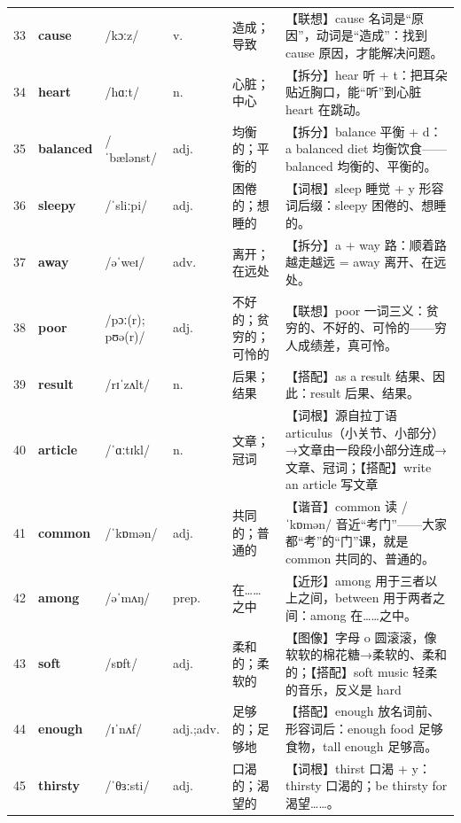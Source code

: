 \documentclass[UTF8,a4paper,11pt,oneside]{ctexbook}
\newcommand{\cellword}[1]{{\bfseries\textcolor{wordcol}{#1}}}
\newcommand{\cellipa}[1]{{\footnotesize\textcolor{ipacol}{#1}}}
\newcommand{\cellpos}[1]{\textcolor{poscol}{#1}}
\newcommand{\cellno}[1]{\textcolor{volcolor!75!black}{#1}}
\begin{document}
{\begin{longtable}{@{}C{0.045\textwidth}L{0.155\textwidth}L{0.175\textwidth}C{0.070\textwidth}L{0.180\textwidth}L{0.282\textwidth}@{}}
 \cellno{33} & \cellword{cause} & \cellipa{/kɔːz/} & \cellpos{v.} & 造成；导致 & \textcolor{tagAssoc}{【联想】}cause 名词是“原因”，动词是“造成”：找到 cause 原因，才能解决问题。 \\
\cellno{34} & \cellword{heart} & \cellipa{/hɑːt/} & \cellpos{n.} & 心脏；中心 & \textcolor{tagSplit}{【拆分】}hear 听 + t：把耳朵贴近胸口，能“听”到心脏 heart 在跳动。 \\
 \cellno{35} & \cellword{balanced} & \cellipa{/ˈbælənst/} & \cellpos{adj.} & 均衡的；平衡的 & \textcolor{tagSplit}{【拆分】}balance 平衡 + d：a balanced diet 均衡饮食——balanced 均衡的、平衡的。 \\
\cellno{36} & \cellword{sleepy} & \cellipa{/ˈsliːpi/} & \cellpos{adj.} & 困倦的；想睡的 & \textcolor{tagRoot}{【词根】}sleep 睡觉 + y 形容词后缀：sleepy 困倦的、想睡的。 \\
 \cellno{37} & \cellword{away} & \cellipa{/əˈweɪ/} & \cellpos{adv.} & 离开；在远处 & \textcolor{tagSplit}{【拆分】}a + way 路：顺着路越走越远 = away 离开、在远处。 \\
\cellno{38} & \cellword{poor} & \cellipa{/pɔː(r); pʊə(r)/} & \cellpos{adj.} & 不好的；贫穷的；可怜的 & \textcolor{tagAssoc}{【联想】}poor 一词三义：贫穷的、不好的、可怜的——穷人成绩差，真可怜。 \\
 \cellno{39} & \cellword{result} & \cellipa{/rɪˈzʌlt/} & \cellpos{n.} & 后果；结果 & \textcolor{tagColloc}{【搭配】}as a result 结果、因此：result 后果、结果。 \\
\cellno{40} & \cellword{article} & \cellipa{/ˈɑːtɪkl/} & \cellpos{n.} & 文章；冠词 & \textcolor{tagRoot}{【词根】}源自拉丁语 articulus（小关节、小部分）→\allowbreak{}文章由一段段小部分连成→\allowbreak{}文章、冠词；\textcolor{tagColloc}{【搭配】}write an article 写文章 \\
 \cellno{41} & \cellword{common} & \cellipa{/ˈkɒmən/} & \cellpos{adj.} & 共同的；普通的 & \textcolor{tagSound}{【谐音】}common 读 /ˈkɒmən/ 音近“考门”——大家都“考”的“门”课，就是 common 共同的、普通的。 \\
\cellno{42} & \cellword{among} & \cellipa{/əˈmʌŋ/} & \cellpos{prep.} & 在……之中 & \textcolor{tagNear}{【近形】}among 用于三者以上之间，between 用于两者之间：among 在……之中。 \\
 \cellno{43} & \cellword{soft} & \cellipa{/sɒft/} & \cellpos{adj.} & 柔和的；柔软的 & \textcolor{tagImage}{【图像】}字母 o 圆滚滚，像软软的棉花糖→\allowbreak{}柔软的、柔和的；\textcolor{tagColloc}{【搭配】}soft music 轻柔的音乐，反义是 hard \\
\cellno{44} & \cellword{enough} & \cellipa{/ɪˈnʌf/} & \cellpos{adj.;\allowbreak{}adv.} & 足够的；足够地 & \textcolor{tagColloc}{【搭配】}enough 放名词前、形容词后：enough food 足够食物，tall enough 足够高。 \\
 \cellno{45} & \cellword{thirsty} & \cellipa{/ˈθɜːsti/} & \cellpos{adj.} & 口渴的；渴望的 & \textcolor{tagRoot}{【词根】}thirst 口渴 + y：thirsty 口渴的；be thirsty for 渴望……。 \\
\end{longtable}
}
\end{document}
